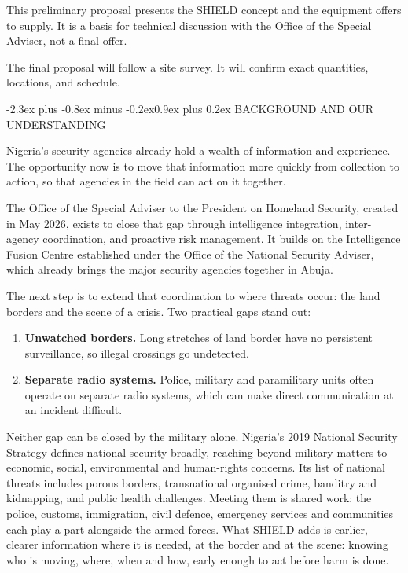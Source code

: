 \documentclass[10pt,letterpaper]{article}
\makeatletter
\renewcommand\section{\@startsection{section}{1}{0pt}%
  {-2.3ex plus -0.8ex minus -0.2ex}{0.9ex plus 0.2ex}%
  {\color{SDSSNavy}\large\bfseries}}
\makeatother
\begin{document}
This preliminary proposal presents the SHIELD concept and the equipment \CompanyShort{} offers to supply. It is a basis for technical discussion with the Office of the Special Adviser, not a final offer.

The final proposal will follow a site survey. It will confirm exact quantities, locations, and schedule.

\section{BACKGROUND AND OUR UNDERSTANDING}

Nigeria's security agencies already hold a wealth of information and experience. The opportunity now is to move that information more quickly from collection to action, so that agencies in the field can act on it together.

The Office of the Special Adviser to the President on Homeland Security, created in May 2026, exists to close that gap through intelligence integration, inter-agency coordination, and proactive risk management. It builds on the Intelligence Fusion Centre established under the Office of the National Security Adviser, which already brings the major security agencies together in Abuja.

The next step is to extend that coordination to where threats occur: the land borders and the scene of a crisis. Two practical gaps stand out:

\begin{enumerate}[label=\alph*.,leftmargin=2em,itemsep=5pt]
  \item \textbf{Unwatched borders.} Long stretches of land border have no persistent surveillance, so illegal crossings go undetected.
  \item \textbf{Separate radio systems.} Police, military and paramilitary units often operate on separate radio systems, which can make direct communication at an incident difficult.
\end{enumerate}

Neither gap can be closed by the military alone. Nigeria's 2019 National Security Strategy defines national security broadly, reaching beyond military matters to economic, social, environmental and human-rights concerns. Its list of national threats includes porous borders, transnational organised crime, banditry and kidnapping, and public health challenges. Meeting them is shared work: the police, customs, immigration, civil defence, emergency services and communities each play a part alongside the armed forces. What SHIELD adds is earlier, clearer information where it is needed, at the border and at the scene: knowing who is moving, where, when and how, early enough to act before harm is done.
\end{document}
